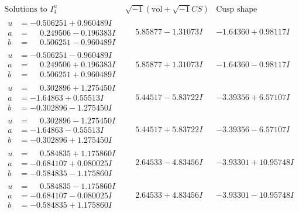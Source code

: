 \documentclass[1p]{elsarticle_modified}
\theoremstyle{definition}
\newcommand{\I}{\sqrt{-1}}
\begin{document}
$$\begin{array}{c|c|c}  
\text{Solutions to }I^u_{4}& \I (\text{vol} + \sqrt{-1}CS) & \text{Cusp shape}\\
 \hline 
\begin{aligned}
u &= -0.506251 + 0.960489 I \\
a &= \phantom{-}0.249506 - 0.196383 I \\
b &= \phantom{-}0.506251 - 0.960489 I\end{aligned}
 & \phantom{-}5.85877 - 1.31073 I & -1.64360 + 0.98117 I \\ \hline\begin{aligned}
u &= -0.506251 - 0.960489 I \\
a &= \phantom{-}0.249506 + 0.196383 I \\
b &= \phantom{-}0.506251 + 0.960489 I\end{aligned}
 & \phantom{-}5.85877 + 1.31073 I & -1.64360 - 0.98117 I \\ \hline\begin{aligned}
u &= \phantom{-}0.302896 + 1.275450 I \\
a &= -1.64863 + 0.55513 I \\
b &= -0.302896 - 1.275450 I\end{aligned}
 & \phantom{-}5.44517 - 5.83722 I & -3.39356 + 6.57107 I \\ \hline\begin{aligned}
u &= \phantom{-}0.302896 - 1.275450 I \\
a &= -1.64863 - 0.55513 I \\
b &= -0.302896 + 1.275450 I\end{aligned}
 & \phantom{-}5.44517 + 5.83722 I & -3.39356 - 6.57107 I \\ \hline\begin{aligned}
u &= \phantom{-}0.584835 + 1.175860 I \\
a &= -0.684107 + 0.080025 I \\
b &= -0.584835 - 1.175860 I\end{aligned}
 & \phantom{-}2.64533 - 4.83456 I & -3.93301 + 10.95748 I \\ \hline\begin{aligned}
u &= \phantom{-}0.584835 - 1.175860 I \\
a &= -0.684107 - 0.080025 I \\
b &= -0.584835 + 1.175860 I\end{aligned}
 & \phantom{-}2.64533 + 4.83456 I & -3.93301 - 10.95748 I \\ \hline\begin{aligned}

\end{aligned}
\end{array}$$
\end{document}
